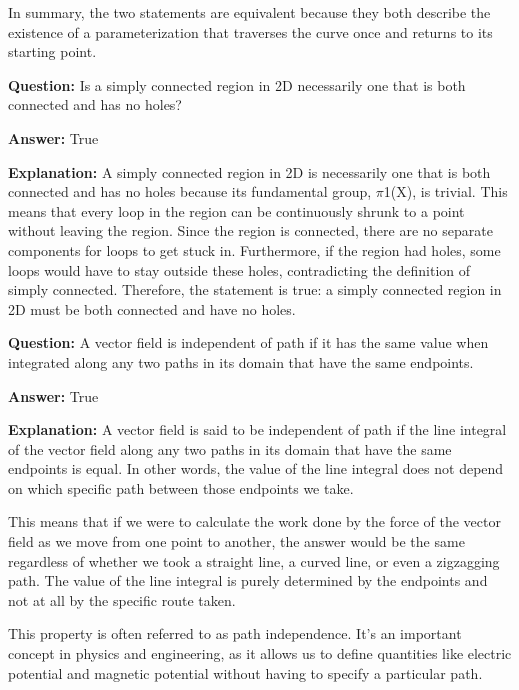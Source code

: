 \documentclass{article}
\begin{document}
In summary, the two statements are equivalent because they both describe the existence of a parameterization that traverses the curve once and returns to its starting point.
                
                \vspace{0.5cm} 
        
            
                \textbf {Question:} Is a simply connected region in 2D necessarily one that is both connected and has no holes?
                
                \textbf{Answer:} True

                \textbf{Explanation:} A simply connected region in 2D is necessarily one that is both connected and has no holes because its fundamental group, \ensuremath{\pi}1(X), is trivial. This means that every loop in the region can be continuously shrunk to a point without leaving the region. Since the region is connected, there are no separate components for loops to get stuck in. Furthermore, if the region had holes, some loops would have to stay outside these holes, contradicting the definition of simply connected. Therefore, the statement is true: a simply connected region in 2D must be both connected and have no holes.
                
                \vspace{0.5cm} 
        
            
                \textbf {Question:} A vector field is independent of path if it has the same value when integrated along any two paths in its domain that have the same endpoints.
                
                \textbf{Answer:} True

                \textbf{Explanation:} A vector field is said to be independent of path if the line integral of the vector field along any two paths in its domain that have the same endpoints is equal. In other words, the value of the line integral does not depend on which specific path between those endpoints we take.

This means that if we were to calculate the work done by the force of the vector field as we move from one point to another, the answer would be the same regardless of whether we took a straight line, a curved line, or even a zigzagging path. The value of the line integral is purely determined by the endpoints and not at all by the specific route taken.

This property is often referred to as path independence. It's an important concept in physics and engineering, as it allows us to define quantities like electric potential and magnetic potential without having to specify a particular path.
                
\end{document}
